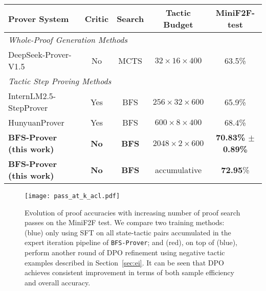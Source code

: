 \documentclass[10pt,english]{article}
\newcommand{\bfs}{\textbf{BFS}}
\begin{document}
\begin{table*}[htbp]
   \centering
   \renewcommand{\arraystretch}{2.0}  %
   \begin{tabular}{lcccc}
   \hline
   Prover System & Critic & Search & Tactic Budget & MiniF2F-test \\
   \hline
   \multicolumn{5}{l}{\textit{Whole-Proof Generation Methods}} \\
   DeepSeek-Prover-V1.5 \citep{deepseek-proer-v1.5} & No & MCTS & $32 \times 16 \times 400$ & 63.5\% \\
   \hline
   \multicolumn{5}{l}{\textit{Tactic Step Proving Methods}} \\
   InternLM2.5-StepProver \citep{intern-prover-v2.5} & Yes & BFS & $256 \times 32 \times 600$ & 65.9\% \\
   HunyuanProver~\citep{hunyuanprover} & Yes & BFS & $600 \times 8 \times 400$ & 68.4\% \\
   \textbf{BFS-Prover (this work)} & \textbf{No} & \bfs & $2048 \times 2 \times 600$ & \textbf{70.83\% $\pm$ 0.89\%} \\
   \textbf{BFS-Prover (this work)} & \textbf{No} & \bfs & accumulative & \textbf{72.95}\% \\
   \hline
   \end{tabular}
   \caption{Comparison between \texttt{BFS-Prover} and leading theorem provers in the literature on the MiniF2F test set. Each prover's performance is evaluated using its reported tactic generation budget, which represents the total number of inference calls during proof search. Note that DeepSeek-Prover-V1.5 is a whole-proof generation method and we decompose its tactic budget for ease of comparison. \texttt{BFS-Prover} achieves state-of-the-art performance without requiring a critic model (value function) and MCTS.}
   \label{tab:sota}
\end{table*}

\begin{figure}[htbp]
\centering
\texttt{[image: pass\_at\_k\_acl.pdf]}
\caption{Evolution of proof accuracies with increasing number of proof search passes on the MiniF2F test. We compare two training methods: {\color{blue}(blue)} only using SFT on all state-tactic pairs accumulated in the expert iteration pipeline of \texttt{BFS-Prover}; and {\color{red}(red)}, on top of {\color{blue}(blue)}, perform another round of DPO refinement using negative tactic examples described in Section~\ref{sec:ei}. It can be seen that DPO achieves consistent improvement in terms of both sample efficiency and overall accuracy.}
\label{fig:scale}
\end{figure}
\end{document}
